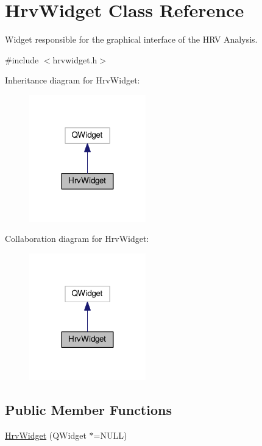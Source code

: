 \hypertarget{classHrvWidget}{}\section{Hrv\+Widget Class Reference}
\label{classHrvWidget}


Widget responsible for the graphical interface of the H\+RV Analysis.  




{\ttfamily \#include $<$hrvwidget.\+h$>$}



Inheritance diagram for Hrv\+Widget\+:
\nopagebreak
\begin{figure}[H]
\begin{center}
\leavevmode
\includegraphics[width=143pt]{classHrvWidget__inherit__graph}
\end{center}
\end{figure}


Collaboration diagram for Hrv\+Widget\+:
\nopagebreak
\begin{figure}[H]
\begin{center}
\leavevmode
\includegraphics[width=143pt]{classHrvWidget__coll__graph}
\end{center}
\end{figure}
\subsection*{Public Member Functions}
\begin{DoxyCompactItemize}
\item 
\hyperlink{classHrvWidget_adfd3a1b7a3c35e4380208cbe8d620c88}{Hrv\+Widget} (Q\+Widget $\ast$=N\+U\+LL)
\end{DoxyCompactItemize}


